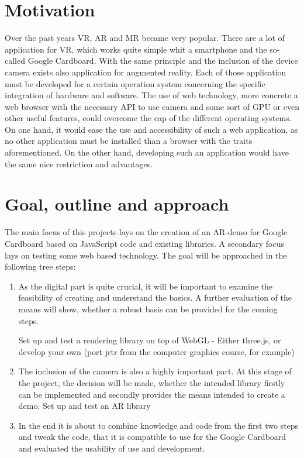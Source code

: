 \section{Motivation}

Over the past years VR, AR and MR became very popular. There are a lot of application for VR, which works quite simple whit a smartphone and the so-called Google Cardboard. With the same principle and the inclusion of the device camera exists also application for augmented reality. Each of those application must be developed for a certain operation system concerning the specific integration of hardware and software. 
The use of web technology, more concrete a web browser with the necessary API to use camera and some sort of GPU or even other useful features, could overcome the cap of the different operating systems. On one hand, it would ease the use and accessibility of such a web application, as no other application must be installed than a browser with the traits aforementioned. On the other hand, developing such an application would have the same nice restriction and advantages. 



\section{Goal, outline and approach}

The main focus of this projects lays on the creation of an AR-demo for Google Cardboard based on JavaScript code and existing libraries. A secondary focus lays on testing some web based technology.
The goal will be approached in the following tree steps:

\begin{enumerate}
    \item As the digital part is quite crucial, it will be important to examine the feasibility of creating and understand the basics. A further evaluation of the means will show, whether a robust basis can be provided for the coming steps.
    
    Set up and test a rendering library on top of WebGL  - Either three.js, or develop your own (port jrtr from the computer graphics course, for example) 
    
    \item The inclusion of the camera is also a highly important part. At this stage of the project, the decision will be made, whether the intended library firstly can be implemented and secondly provides the means intended to create a demo.
    Set up and test an AR library 
    
    \item In the end it is about to combine knowledge and code from the first two steps and tweak the code, that it is compatible to use for the Google Cardboard and evaluated the usability of use and development.
\end{enumerate}





